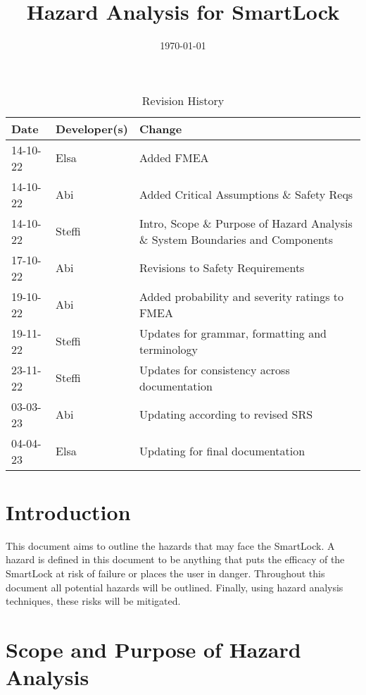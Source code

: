 \documentclass{article}
\title{Hazard Analysis for SmartLock\\\progname}
\author{\authname}
\date{\today}
\begin{document}
\maketitle
\thispagestyle{empty}

\newpage
{}

\begin{table}[hp]
\caption{Revision History} \label{TblRevisionHistory}
\begin{tabularx}{\textwidth}{llX}
\toprule
\textbf{Date} & \textbf{Developer(s)} & \textbf{Change}\\
\midrule
14-10-22 & Elsa & Added FMEA\\
14-10-22 & Abi & Added Critical Assumptions \& Safety Reqs\\
14-10-22 & Steffi & Intro, Scope \& Purpose of Hazard Analysis \& System Boundaries and Components\\
17-10-22 & Abi & Revisions to Safety Requirements\\
19-10-22 & Abi & Added probability and severity ratings to FMEA \\
19-11-22 & Steffi & Updates for grammar, formatting and terminology\\
23-11-22 & Steffi & Updates for consistency across documentation\\
03-03-23 & Abi & Updating according to revised SRS\\
04-04-23 & Elsa & Updating for final documentation\\
\bottomrule
\end{tabularx}
\end{table}

\newpage


\tableofcontents

\listoftables

\listoffigures

\newpage


\section{Introduction}
This document aims to outline the hazards that may face the SmartLock.  A hazard is defined in this document to be anything that puts the efficacy of the SmartLock at risk of failure or places the user in danger.  Throughout this document all potential hazards will be outlined. Finally, using hazard analysis techniques,  these risks will be mitigated. 

\section{Scope and Purpose of Hazard Analysis}
\end{document}
